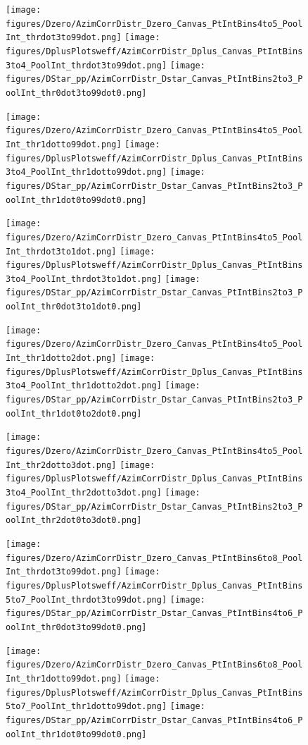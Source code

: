 \begin{figure}[htbp]
\centering




{\texttt{[image: figures/Dzero/AzimCorrDistr\_Dzero\_Canvas\_PtIntBins4to5\_PoolInt\_thrdot3to99dot.png]}}
{\texttt{[image: figures/DplusPlotsweff/AzimCorrDistr\_Dplus\_Canvas\_PtIntBins3to4\_PoolInt\_thrdot3to99dot.png]}}
{\texttt{[image: figures/DStar\_pp/AzimCorrDistr\_Dstar\_Canvas\_PtIntBins2to3\_PoolInt\_thr0dot3to99dot0.png]}}

{\texttt{[image: figures/Dzero/AzimCorrDistr\_Dzero\_Canvas\_PtIntBins4to5\_PoolInt\_thr1dotto99dot.png]}}
{\texttt{[image: figures/DplusPlotsweff/AzimCorrDistr\_Dplus\_Canvas\_PtIntBins3to4\_PoolInt\_thr1dotto99dot.png]}}
{\texttt{[image: figures/DStar\_pp/AzimCorrDistr\_Dstar\_Canvas\_PtIntBins2to3\_PoolInt\_thr1dot0to99dot0.png]}}





\end{figure}

\begin{figure}[!htbp]
\centering
{\texttt{[image: figures/Dzero/AzimCorrDistr\_Dzero\_Canvas\_PtIntBins4to5\_PoolInt\_thrdot3to1dot.png]}}
{\texttt{[image: figures/DplusPlotsweff/AzimCorrDistr\_Dplus\_Canvas\_PtIntBins3to4\_PoolInt\_thrdot3to1dot.png]}}
{\texttt{[image: figures/DStar\_pp/AzimCorrDistr\_Dstar\_Canvas\_PtIntBins2to3\_PoolInt\_thr0dot3to1dot0.png]}}

{\texttt{[image: figures/Dzero/AzimCorrDistr\_Dzero\_Canvas\_PtIntBins4to5\_PoolInt\_thr1dotto2dot.png]}}
{\texttt{[image: figures/DplusPlotsweff/AzimCorrDistr\_Dplus\_Canvas\_PtIntBins3to4\_PoolInt\_thr1dotto2dot.png]}}
{\texttt{[image: figures/DStar\_pp/AzimCorrDistr\_Dstar\_Canvas\_PtIntBins2to3\_PoolInt\_thr1dot0to2dot0.png]}}

{\texttt{[image: figures/Dzero/AzimCorrDistr\_Dzero\_Canvas\_PtIntBins4to5\_PoolInt\_thr2dotto3dot.png]}}
{\texttt{[image: figures/DplusPlotsweff/AzimCorrDistr\_Dplus\_Canvas\_PtIntBins3to4\_PoolInt\_thr2dotto3dot.png]}}
{\texttt{[image: figures/DStar\_pp/AzimCorrDistr\_Dstar\_Canvas\_PtIntBins2to3\_PoolInt\_thr2dot0to3dot0.png]}}



{\texttt{[image: figures/Dzero/AzimCorrDistr\_Dzero\_Canvas\_PtIntBins6to8\_PoolInt\_thrdot3to99dot.png]}}
{\texttt{[image: figures/DplusPlotsweff/AzimCorrDistr\_Dplus\_Canvas\_PtIntBins5to7\_PoolInt\_thrdot3to99dot.png]}}
{\texttt{[image: figures/DStar\_pp/AzimCorrDistr\_Dstar\_Canvas\_PtIntBins4to6\_PoolInt\_thr0dot3to99dot0.png]}}

{\texttt{[image: figures/Dzero/AzimCorrDistr\_Dzero\_Canvas\_PtIntBins6to8\_PoolInt\_thr1dotto99dot.png]}}
{\texttt{[image: figures/DplusPlotsweff/AzimCorrDistr\_Dplus\_Canvas\_PtIntBins5to7\_PoolInt\_thr1dotto99dot.png]}}
{\texttt{[image: figures/DStar\_pp/AzimCorrDistr\_Dstar\_Canvas\_PtIntBins4to6\_PoolInt\_thr1dot0to99dot0.png]}}

\end{figure}

